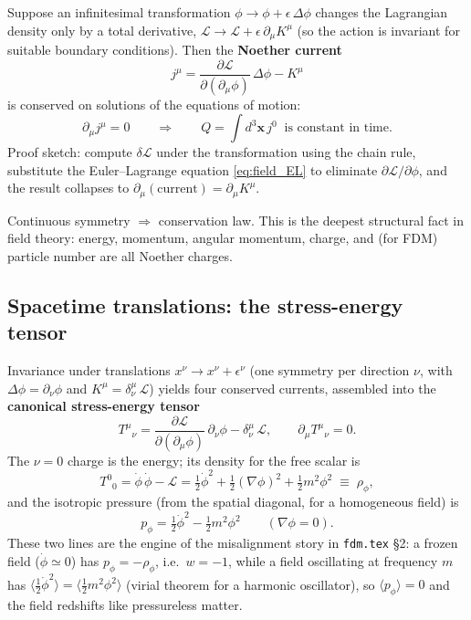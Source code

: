 \documentclass[12pt]{article}
\newcommand{\bx}{\mathbf{x}}
\newcommand{\Lag}{\mathcal{L}}
\begin{document}
Suppose an infinitesimal transformation
$\phi \to \phi + \epsilon\,\Delta\phi$ changes the Lagrangian density
only by a total derivative, $\Lag \to \Lag +
\epsilon\,\partial_\mu K^\mu$ (so the action is invariant for
suitable boundary conditions).  Then the \textbf{Noether current}
%
\begin{equation}
  j^\mu = \frac{\partial\Lag}{\partial(\partial_\mu\phi)}\,\Delta\phi
          - K^\mu
  \label{eq:noether_current}
\end{equation}
%
is conserved on solutions of the equations of motion:
%
\begin{equation}
  \partial_\mu j^\mu = 0
  \qquad\Longrightarrow\qquad
  Q = \int d^3\bx\, j^0 \;\;\text{is constant in time.}
\end{equation}
%
Proof sketch: compute $\delta\Lag$ under the transformation using the
chain rule, substitute the Euler--Lagrange equation
\eqref{eq:field_EL} to eliminate $\partial\Lag/\partial\phi$, and the
result collapses to $\partial_\mu(\text{current}) =
\partial_\mu K^\mu$.

Continuous symmetry $\Rightarrow$ conservation law.  This is the
deepest structural fact in field theory: energy, momentum, angular
momentum, charge, and (for FDM) particle number are all Noether
charges.

\subsection{Spacetime translations: the stress-energy tensor}
\label{sec:stress}

Invariance under translations $x^\nu \to x^\nu + \epsilon^\nu$
(one symmetry per direction $\nu$, with $\Delta\phi = \partial_\nu\phi$
and $K^\mu = \delta^\mu_\nu\,\Lag$) yields four conserved currents,
assembled into the \textbf{canonical stress-energy tensor}
%
\begin{equation}
  T^\mu{}_\nu
    = \frac{\partial\Lag}{\partial(\partial_\mu\phi)}\,\partial_\nu\phi
      - \delta^\mu_\nu\,\Lag,
  \qquad
  \partial_\mu T^\mu{}_\nu = 0.
  \label{eq:stress_tensor}
\end{equation}
%
The $\nu=0$ charge is the energy; its density for the free scalar is
%
\begin{equation}
  T^0{}_0
    = \dot\phi\,\dot\phi - \Lag
    = \tfrac{1}{2}\dot\phi^2 + \tfrac{1}{2}(\nabla\phi)^2
      + \tfrac{1}{2}m^2\phi^2
    \;\equiv\; \rho_\phi,
  \label{eq:energy_density}
\end{equation}
%
and the isotropic pressure (from the spatial diagonal, for a
homogeneous field) is
%
\begin{equation}
  p_\phi = \tfrac{1}{2}\dot\phi^2 - \tfrac{1}{2}m^2\phi^2
  \qquad (\nabla\phi = 0).
  \label{eq:pressure}
\end{equation}
%
These two lines are the engine of the misalignment story in
\texttt{fdm.tex} \S2: a frozen field ($\dot\phi\simeq 0$) has
$p_\phi = -\rho_\phi$, i.e.\ $w=-1$, while a field oscillating at
frequency $m$ has $\langle\tfrac{1}{2}\dot\phi^2\rangle =
\langle\tfrac{1}{2}m^2\phi^2\rangle$ (virial theorem for a harmonic
oscillator), so $\langle p_\phi\rangle = 0$ and the field redshifts
like pressureless matter.
\end{document}
